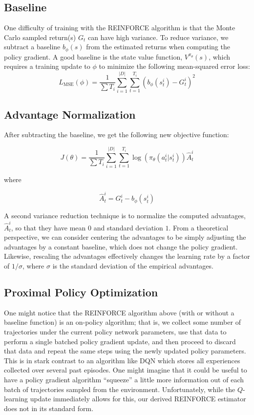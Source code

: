 \documentclass{article}
\begin{document}
\subsection{Baseline}
One difficulty of training with the REINFORCE algorithm is that the Monte Carlo sampled return(s) $G_t$ can have high variance. To reduce variance, we subtract a baseline $b_{\phi}(s)$ from the estimated returns when computing the policy gradient. A good baseline is the state value function, $V^{\pi_\theta}(s)$, which requires a training update to $\phi$ to minimize the following mean-squared error loss:
\[ L_{\text{MSE}}(\phi) = \frac{1}{\sum T_i} \sum_{i=1}^{|D|} \sum_{t=1}^{T_i} (b_{\phi}(s^i_t) - G^i_t)^2\]
\subsection{Advantage Normalization}

After subtracting the baseline, we get the following new objective function:

\[ J(\theta) = \frac{1}{\sum T_i} \sum_{i=1}^{|D|} \sum_{t=1}^{T_i} \log(\pi_\theta(a^i_t|s^i_t)) \hat{A}^i_t \]

where

\[\hat{A}^i_t = G^i_t - b_{\phi}(s^i_t)\]

A second variance reduction technique is to normalize the computed advantages, $\hat{A}^i_t$, so that they have mean $0$ and standard deviation $1$. From a theoretical perspective, we can consider centering the advantages to be simply adjusting the advantages by a constant baseline, which does not change the policy gradient. Likewise, rescaling the advantages effectively changes the learning rate by a factor of $1/\sigma$, where $\sigma$ is the standard deviation of the empirical advantages.

\subsection{Proximal Policy Optimization}

One might notice that the REINFORCE algorithm above (with or without a baseline function) is an on-policy algorithm; that is, we collect some number of trajectories under the current policy network parameters, use that data to perform a single batched policy gradient update, and then proceed to discard that data and repeat the same steps using the newly updated policy parameters. This is in stark contrast to an algorithm like DQN which stores all experiences collected over several past episodes. One might imagine that it could be useful to have a policy gradient algorithm ``squeeze'' a little more information out of each batch of trajectories sampled from the environment. Unfortunately, while the $Q$-learning update immediately allows for this, our derived REINFORCE estimator does not in its standard form.
\end{document}
